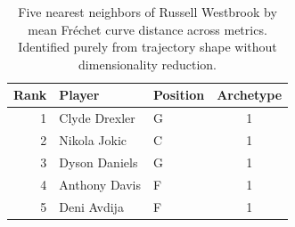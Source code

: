 \begin{table}[htbp]
  \centering\small
  \begin{tabular}{rllc}
    \toprule
    Rank & Player & Position & Archetype \\
    \midrule
    1 & Clyde Drexler & G & 1 \\
    2 & Nikola Jokic & C & 1 \\
    3 & Dyson Daniels & G & 1 \\
    4 & Anthony Davis & F & 1 \\
    5 & Deni Avdija & F & 1 \\
    \bottomrule
  \end{tabular}
  \caption{Five nearest neighbors of Russell Westbrook by mean Fr\'{e}chet curve distance across metrics. Identified purely from trajectory shape without dimensionality reduction.}
  \label{tab:Russell_Westbrook_frechet_curve_neighbors}
\end{table}


